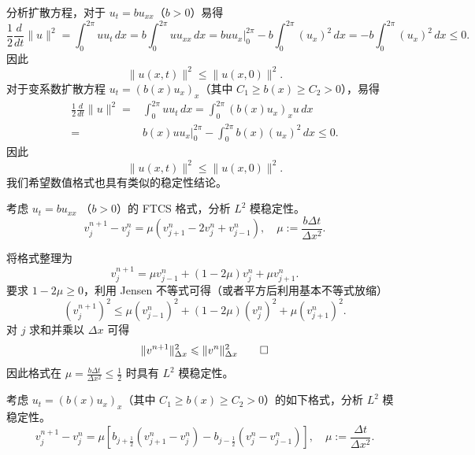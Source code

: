 分析扩散方程，对于 $u_t = b u_{xx}$（$b > 0$）易得
\[
    \frac12 \frac{d}{dt} \| u \|^2 = \int_{0}^{2\pi} u u_t \,dx = b \int_0^{2\pi} u u_{xx}\,dx
    = b u u_x \big|_0^{2\pi} - b \int_{0}^{2\pi} (u_x)^2\,dx = - b \int_{0}^{2\pi} (u_x)^2\,dx \le 0.
\]
因此
\[
    \| u(x,t) \|^2 \le \| u(x,0) \|^2.
\]
对于变系数扩散方程 $u_t = (b(x) u_x)_x$（其中 $C_1 \ge b(x) \ge C_2 > 0$），易得
\begin{align*}
    \frac12 \frac{d}{dt} \|u\|^2 ={} & \int_{0}^{2\pi} u u_t \,dx
    = \int_0^{2\pi} (b(x) u_x)_x u\,dx                                      \\
    ={}                              & \left. b(x) u u_x \right|_{0}^{2\pi}
    - \int_{0}^{2\pi} b(x) (u_x)^2\,dx \le 0.
\end{align*}
因此
\[
    \| u(x,t) \|^2 \le \| u(x,0) \|^2.
\]
我们希望数值格式也具有类似的稳定性结论。

\begin{example}
    考虑 $u_t = b u_{xx}$ （$b > 0$）的 FTCS 格式，分析 $L^2$ 模稳定性。
    \[
        v_j^{n+1} - v_j^n = \mu (v_{j+1}^n - 2v_j^n + v_{j-1}^n),\quad \mu := \frac{b \Delta t}{\Delta x^2}.
    \]
\end{example}

\begin{solution*}
    将格式整理为
    \[
        v_j^{n+1} = \mu v_{j-1}^n + (1-2\mu) v_j^n + \mu v_{j+1}^n.
    \]
    要求 $1-2\mu \ge 0$，利用 Jensen 不等式可得（或者平方后利用基本不等式放缩）
    \[
        (v_j^{n+1})^2 \le \mu (v_{j-1}^n)^2 + (1-2\mu) (v_j^n)^2 + \mu (v_{j+1}^n)^2.
    \]
    对 $j$ 求和并乘以 $\Delta x$ 可得
    \[
        \| v^{n+1} \|_{\Delta x}^2 \le \| v^{n} \|_{\Delta x}^2 \qedhere
    \]
    因此格式在 $\mu = \frac{b \Delta t}{\Delta x^2} \le \frac12$ 时具有 $L^2$ 模稳定性。
\end{solution*}

\begin{example}
    考虑 $u_t = (b(x) u_x)_x$（其中 $C_1 \ge b(x) \ge C_2 > 0$）的如下格式，分析 $L^2$ 模稳定性。
    \[
        v_j^{n+1}-v_j^n =
        \mu \left[ b_{j+\frac12} (v_{j+1}^n - v_j^{n})
        - b_{j-\frac12} (v_{j}^n - v_{j-1}^{n})\right]
        ,\quad \mu := \frac{\Delta t}{\Delta x^2}.
    \]
\end{example}

